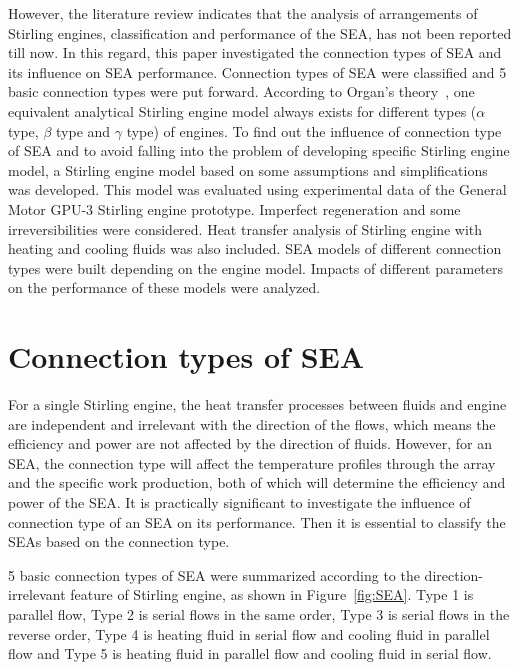However, the literature review indicates that the analysis of arrangements of Stirling engines, classification and performance of the SEA, has not been reported till now. In this regard, this paper investigated the connection types of SEA and its influence on SEA performance. Connection types of SEA were classified and 5 basic connection types were put forward. According to Organ's theory~\cite{Organ1997}, one equivalent analytical Stirling engine model always exists for different types ($\alpha$ type, $\beta$ type and $\gamma$ type) of engines. To find out the influence of connection type of SEA and to avoid falling into the problem of developing specific Stirling engine model, a Stirling engine model based on some assumptions and simplifications was developed. This model was evaluated using experimental data of the General Motor GPU-3 Stirling engine prototype. Imperfect regeneration and some irreversibilities were considered. Heat transfer analysis of Stirling engine with heating and cooling fluids was also included. SEA models of different connection types were built depending on the engine model. Impacts of different parameters on the performance of these models were analyzed.

\section{Connection types of SEA}
For a single Stirling engine, the heat transfer processes between fluids and engine are independent and irrelevant with the direction of the flows, which means the efficiency and power are not affected by the direction of fluids. However, for an SEA, the connection type will affect the temperature profiles through the array and the specific work production, both of which will determine the efficiency and power of the SEA. It is practically significant to investigate the influence of connection type of an SEA on its performance. Then it is essential to classify the SEAs based on the connection type.

5 basic connection types of SEA were summarized according to the direction-irrelevant feature of Stirling engine, as shown in Figure~\ref{fig:SEA}. Type 1 is parallel flow, Type 2 is serial flows in the same order, Type 3 is serial flows in the reverse order, Type 4 is heating fluid in serial flow and cooling fluid in parallel flow and Type 5 is heating fluid in parallel flow and cooling fluid in serial flow.

